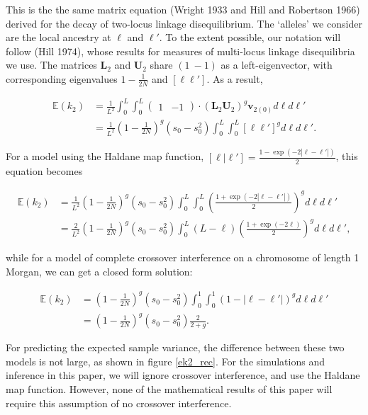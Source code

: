 \documentclass[11pt]{amsart}
\begin{document}
This is the the same matrix equation (Wright 1933 and Hill and Robertson 1966) derived for the decay of two-locus linkage disequilibrium.
The `alleles' we consider are the local ancestry at $\ell$ and $\ell'$.
To the extent possible, our notation will follow (Hill 1974), whose results for measures of multi-locus linkage disequilibria we use.
The matrices $\mathbf{L}_2$ and $\mathbf{U}_2$ share $(1\ -1)$ as a left-eigenvector, with corresponding eigenvalues $1-\frac{1}{2N}$ and $[\ell\ell']$.
As a result,

\begin{align}
	\mathbb{E}(k_2)&=\frac{1}{L^2}\int_0^L\int_0^L\left( \begin{array}{cc}
			1 & -1	\end{array} \right)\cdot\left(\mathbf{L}_2\mathbf{U}_2\right)^g
		\mathbf{v}_{2(0)} d\ell d\ell'\nonumber\\
		&=\frac{1}{L^2}\left(1-\frac{1}{2N}\right)^g\left( s_{0}-s_{0}^2 \right)\int_0^L\int_0^L [\ell\ell']^g d\ell d\ell'.
	\label{k2_pulse}
\end{align}

For a model using the Haldane map function,  $[\ell|\ell']=\frac{1-\exp(-2|\ell-\ell'|)}{2}$, this equation becomes

\begin{align*}
	\mathbb{E}(k_2)&=\frac{1}{L^2}\left(1-\frac{1}{2N}\right)^g\left( s_{0}-s_{0}^2 \right)\int_0^L\int_0^L \left(\frac{1+\exp(-2|\ell-\ell'|)}{2}\right)^g d\ell d\ell'\\
	&=\frac{2}{L^2}\left(1-\frac{1}{2N}\right)^g\left( s_{0}-s_{0}^2 \right)\int_0^L (L-\ell)\left(\frac{1+\exp(-2\ell)}{2}\right)^g d\ell d\ell',
\end{align*}

 while for a model of complete crossover interference on a chromosome of length 1 Morgan, we can get a closed form solution:

\begin{align*}
	\mathbb{E}(k_2)&=\left(1-\frac{1}{2N}\right)^g\left( s_{0}-s_{0}^2 \right)\int_0^1\int_0^1 \left(1-|\ell-\ell'|\right)^g d\ell d\ell'\\
	&=\left(1-\frac{1}{2N}\right)^g \left(s_{0}-s_{0}^2\right) \frac{2}{2+g}.
\end{align*}

For predicting the expected sample variance, the difference between these two models is not large, as shown in figure \ref{ek2_rec}.
For the simulations and inference in this paper, we will ignore crossover interference, and use the Haldane map function.
However, none of the mathematical results of this paper will require this assumption of no crossover interference.
\end{document}
